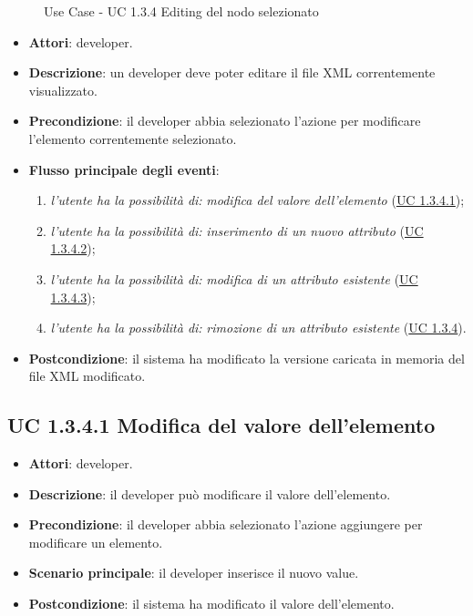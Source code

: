 		\begin{figure}[!h] 
			\centering 
			\caption{Use Case - UC 1.3.4 Editing del nodo selezionato}
		\end{figure}
		
		\begin{itemize}
			\item\textbf{Attori}: developer.
			\item\textbf{Descrizione}: un developer deve poter editare il file XML correntemente visualizzato.
			\item\textbf{Precondizione}: il developer abbia selezionato l'azione per modificare l'elemento correntemente selezionato.
			\item\textbf{Flusso principale degli eventi}: 
			\begin{enumerate}
				\item \textit{l'utente ha la possibilità di:} \textit{modifica del valore dell'elemento} (\hyperref[subsec:XEUC1.3.4.1]{UC 1.3.4.1});
				
				\item \textit{l'utente ha la possibilità di:} \textit{inserimento di un nuovo attributo} (\hyperref[subsec:XEUC1.3.4.2]{UC 1.3.4.2});
				
				\item \textit{l'utente ha la possibilità di:} \textit{modifica di un attributo esistente} (\hyperref[subsec:XEUC1.3.4.3]{UC 1.3.4.3});
				
				\item \textit{l'utente ha la possibilità di:} \textit{rimozione di un attributo esistente} (\hyperref[subsec:XEUC1.3.4.4]{UC 1.3.4}).
				
			\end{enumerate}
			\item\textbf{Postcondizione}: il sistema ha modificato la versione caricata in memoria del file XML modificato.
		\end{itemize}
		
	\subsection{UC 1.3.4.1 Modifica del valore dell'elemento}
		\label{subsec:XEUC1.3.4.1}
		
		\begin{itemize}
			\item\textbf{Attori}: developer.
			\item\textbf{Descrizione}: il developer può modificare il valore dell'elemento.
			\item\textbf{Precondizione}: il developer abbia selezionato l'azione aggiungere per modificare un elemento.
			\item\textbf{Scenario principale}: il developer inserisce il nuovo value.
			\item\textbf{Postcondizione}: il sistema ha modificato il valore dell'elemento.
		\end{itemize}
		
